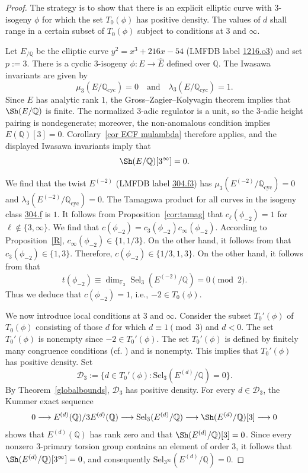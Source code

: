 \documentclass[12pt]{amsart}
\newcommand{\Q}{\mathbb{Q}}
\newcommand{\F}{\mathbb{F}}
\newcommand{\Sel}{\mathrm{Sel}}
\newcommand{\op}[1]{\operatorname{#1}}
\numberwithin{equation}{section}
\begin{document}
\begin{proof}
The strategy is to show that there is an explicit elliptic curve with $3$-isogeny $\phi$ for which the set $T_0(\phi)$ has positive density. The values of $d$ shall range in a certain subset of $T_0(\phi)$ subject to conditions at $3$ and $\infty$.

\par Let $E_{/\Q}$ be the elliptic curve $y^2=x^3+216x-54$ (LMFDB label \href{https://www.lmfdb.org/EllipticCurve/Q/1216/o/3}{1216.o3}) and set $p:=3$. There is a cyclic $3$-isogeny $\phi:E\rightarrow\widehat{E}$ defined over $\Q$. The Iwasawa invariants are given by
\[
\mu_3(E/\Q_{\op{cyc}})=0
\quad\text{and}\quad
\lambda_3(E/\Q_{\op{cyc}})=1.
\]
Since $E$ has analytic rank $1$, the Gross--Zagier--Kolyvagin theorem implies that $\Sh(E/\Q)$ is finite. The normalized $3$-adic regulator is a unit, so the $3$-adic height pairing is nondegenerate; moreover, the non-anomalous condition implies $E(\Q)[3]=0$. Corollary~\ref{cor ECF mulambda} therefore applies, and the displayed Iwasawa invariants imply that
\[
\Sh(E/\Q)[3^\infty]=0.
\]

We find that the twist $E^{(-2)}$ (LMFDB label \href{https://www.lmfdb.org/EllipticCurve/Q/304/f/3}{304.f3}) has $\mu_3(E^{(-2)}/\Q_{\op{cyc}})=0$ and $\lambda_3(E^{(-2)}/\Q_{\op{cyc}})=0$. The Tamagawa product for all curves in the isogeny class \href{https://www.lmfdb.org/EllipticCurve/Q/304/f/}{304.f} is $1$. It follows from Proposition~\ref{cor:tamag} that $c_\ell(\phi_{-2})=1$ for $\ell\notin\{3,\infty\}$. We find that $c(\phi_{-2})=c_3(\phi_{-2})c_\infty(\phi_{-2})$. According to Proposition~\ref{R}, $c_\infty(\phi_{-2})\in\{1,1/3\}$. On the other hand, it follows from \cite[Theorem~10.5]{BKOS} that $c_3(\phi_{-2})\in\{1,3\}$. Therefore, $c(\phi_{-2})\in\{1/3,1,3\}$. On the other hand, it follows from \cite[Prop.~42(ii)]{BES} that
\[
t(\phi_{-2})\equiv\op{dim}_{\F_3}\op{Sel}_3(E^{(-2)}/\Q)=0\pmod 2.
\]
Thus we deduce that $c(\phi_{-2})=1$, i.e., $-2\in T_0(\phi)$.

\par We now introduce local conditions at $3$ and $\infty$. Consider the subset $T_0'(\phi)$ of $T_0(\phi)$ consisting of those $d$ for which $d\equiv1\pmod 3$ and $d<0$. The set $T_0'(\phi)$ is nonempty since $-2\in T_0'(\phi)$. The set $T_0'(\phi)$ is defined by finitely many congruence conditions (cf. \cite{BKOS}) and is nonempty. This implies that $T_0'(\phi)$ has positive density. Set
\[
\mathcal D_3:=\{d\in T_0'(\phi):\Sel_3(E^{(d)}/\Q)=0\}.
\]
By Theorem~\ref{globalbounds}, $\mathcal D_3$ has positive density. For every $d\in\mathcal D_3$, the Kummer exact sequence
\[
0\longrightarrow E^{(d)}(\Q)/3E^{(d)}(\Q)
\longrightarrow \Sel_3(E^{(d)}/\Q)
\longrightarrow \Sh(E^{(d)}/\Q)[3]
\longrightarrow 0
\]
shows that $E^{(d)}(\Q)$ has rank zero and that $\Sh(E^{(d)}/\Q)[3]=0$. Since every nonzero $3$-primary torsion group contains an element of order $3$, it follows that $\Sh(E^{(d)}/\Q)[3^\infty]=0$, and consequently $\Sel_{3^\infty}(E^{(d)}/\Q)=0$.


\end{proof}
\end{document}
